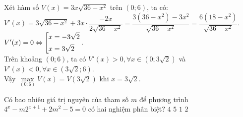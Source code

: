 \begin{ex}
{Xét hàm số $V(x)=3x\sqrt{36-x^2}$ trên $(0;6)$, ta có:\\
$V'(x)=3\sqrt{36-x^2}+3x\cdot \dfrac{-2x}{2\sqrt{36-x^2}}=\dfrac{3(36-x^2)-3x^2}{\sqrt{36-x^2}}=\dfrac{6(18-x^2)}{\sqrt{36-x^2}}$.\\
$V'(x)=0\Leftrightarrow \left[\begin{aligned}&x=-3\sqrt{2}\\&x=3\sqrt{2}\end{aligned}\right.$.\\
Trên khoảng $(0;6)$, ta có $V'(x)>0, \forall x\in (0;3\sqrt{2})$ và $V'(x)<0,\forall x\in (3\sqrt{2};6)$. \\
Vậy $\max\limits_{(0;6)}V(x)=V(3\sqrt{2})$ khi $x=3\sqrt{2}$.
}
\end{ex}

\begin{ex}%
Có bao nhiêu giá trị nguyên của tham số $m$ để phương trình $4^x-m2^{x+1}+2m^2-5=0$ có hai nghiệm phân biệt?
\choice
{$4$}
{$5$}
{\True $1$}
{$2$}
\end{ex}

